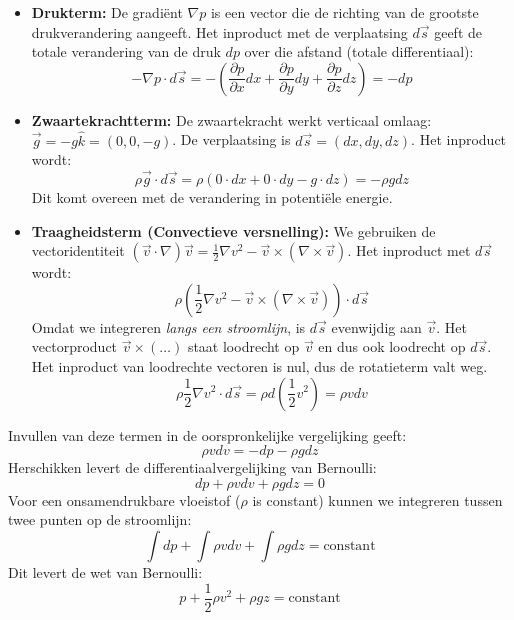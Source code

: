 \documentclass[a4paper,11pt,twoside]{report}
\begin{document}
\begin{itemize}
    \item \textbf{Drukterm:} De gradiënt $\nabla p$ is een vector die de richting van de grootste drukverandering aangeeft. Het inproduct met de verplaatsing $d\vec{s}$ geeft de totale verandering van de druk $dp$ over die afstand (totale differentiaal):
    \[ -\nabla p \cdot d\vec{s} = -\left( \frac{\partial p}{\partial x} dx + \frac{\partial p}{\partial y} dy + \frac{\partial p}{\partial z} dz \right) = -dp \]

    \item \textbf{Zwaartekrachtterm:} De zwaartekracht werkt verticaal omlaag: $\vec{g} = -g \hat{k} = (0, 0, -g)$. De verplaatsing is $d\vec{s} = (dx, dy, dz)$. Het inproduct wordt:
    \[ \rho \vec{g} \cdot d\vec{s} = \rho (0 \cdot dx + 0 \cdot dy - g \cdot dz) = -\rho g dz \]
    Dit komt overeen met de verandering in potentiële energie.

    \item \textbf{Traagheidsterm (Convectieve versnelling):} We gebruiken de vectoridentiteit $(\vec{v} \cdot \nabla)\vec{v} = \frac{1}{2}\nabla v^2 - \vec{v} \times (\nabla \times \vec{v})$.
    Het inproduct met $d\vec{s}$ wordt:
    \[ \rho \left( \frac{1}{2}\nabla v^2 - \vec{v} \times (\nabla \times \vec{v}) \right) \cdot d\vec{s} \]
    Omdat we integreren \textit{langs een stroomlijn}, is $d\vec{s}$ evenwijdig aan $\vec{v}$. Het vectorproduct $\vec{v} \times (\dots)$ staat loodrecht op $\vec{v}$ en dus ook loodrecht op $d\vec{s}$. Het inproduct van loodrechte vectoren is nul, dus de rotatieterm valt weg.
    \[ \rho \frac{1}{2}\nabla v^2 \cdot d\vec{s} = \rho d\left(\frac{1}{2}v^2\right) = \rho v dv \]
\end{itemize}

Invullen van deze termen in de oorspronkelijke vergelijking geeft:
\[
\rho v dv = -dp - \rho g dz
\]
Herschikken levert de differentiaalvergelijking van Bernoulli:
\[
dp + \rho v dv + \rho g dz = 0
\]
Voor een onsamendrukbare vloeistof ($\rho$ is constant) kunnen we integreren tussen twee punten op de stroomlijn:
\[
\int dp + \int \rho v dv + \int \rho g dz = \text{constant}
\]
Dit levert de wet van Bernoulli:
\[
p + \frac{1}{2}\rho v^2 + \rho g z = \text{constant}
\]
\end{document}
